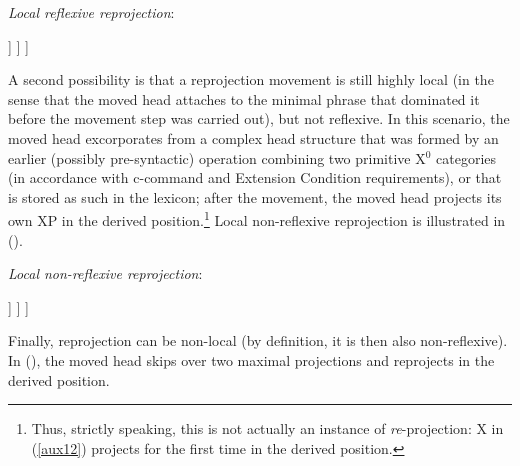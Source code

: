 \documentclass[output=paper
,modfonts
,nonflat]{langsci/langscibook}
\begin{document}
		\begin{exe}
			\ex	\label{ex:mueller:24} {\textit{Local reflexive reprojection}}:\\
				\begin{forest}	
					[XP
					[X\sub{1}]
					[XP
					[WP]
					[X$'$
					[t\sub{1}]
					[ZP]
					] ] ] 	
			\end{forest}
		\end{exe} 
    \noindent A second possibility is that a reprojection movement is still highly
	local (in the sense that the moved head attaches to the minimal phrase
	that dominated it before the movement step was carried out), but not
	reflexive. In this scenario, the moved head excorporates from a complex
	head structure that was formed by an earlier (possibly pre-syntactic) 
	operation combining two primitive X$^0$ categories (in accordance with
	c-command and Extension Condition requirements), or that is stored as
	such in the lexicon; after the movement, the moved head projects its own
	XP in the derived position.\footnote{Thus, strictly speaking, this is
		not actually an instance of {\itshape re}-projection: X in (\ref{aux12})
		projects for the first time in the derived position.} Local non-reflexive
	reprojection is illustrated in (\Next). 

		\begin{exe}
			\ex	\label{ex:mueller:25} {\textit{Local \label{aux12}non-reflexive reprojection}}:\\
				\begin{forest}	
					[XP
					[X\sub{1}]
					[YP
					[WP]
					[Y$'$
					[Y-t\sub{1}]
					[ZP]
					] ] ] 	
			\end{forest}
		\end{exe} 
		
    \noindent Finally, reprojection can be non-local (by definition, it is then also
	non-reflexive). In (\Next), the moved head skips over two maximal
	projections and reprojects in the derived position.\largerpage[1.25]
	
\end{document}
